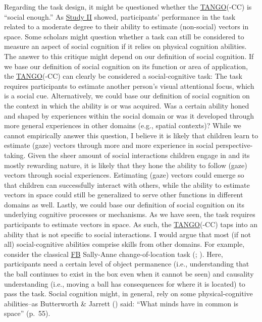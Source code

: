 \documentclass[
]{scrbook}
\begin{document}
Regarding the task design, it might be questioned whether the \hyperref[acronyms_TANGO]{TANGO}(-CC) is ``social enough.'' As \hyperref[studyII]{Study II} showed, participants' performance in the task related to a moderate degree to their ability to estimate (non-social) vectors in space. Some scholars might question whether a task can still be considered to measure an aspect of social cognition if it relies on physical cognition abilities.
The answer to this critique might depend on our definition of social cognition. If we base our definition of social cognition on its function or area of application, the \hyperref[acronyms_TANGO]{TANGO}(-CC) can clearly be considered a social-cognitive task: The task requires participants to estimate another person's visual attentional focus, which is a social cue.
Alternatively, we could base our definition of social cognition on the context in which the ability is or was acquired. Was a certain ability honed and shaped by experiences within the social domain or was it developed through more general experiences in other domains (e.g., spatial contexts)? While we cannot empirically answer this question, I believe it is likely that children learn to estimate (gaze) vectors through more and more experience in social perspective-taking. Given the sheer amount of social interactions children engage in and its mostly rewarding nature, it is likely that they hone the ability to follow (gaze) vectors through social experiences.
Estimating (gaze) vectors could emerge so that children can successfully interact with others, while the ability to estimate vectors in space could still be generalized to serve other functions in different domains as well.
Lastly, we could base our definition of social cognition on its underlying cognitive processes or mechanisms. As we have seen, the task requires participants to estimate vectors in space. As such, the \hyperref[acronyms_TANGO]{TANGO}(-CC) taps into an ability that is not specific to social interactions. I would argue that most (if not all) social-cognitive abilities comprise skills from other domains. For example, consider the classical \hyperref[acronyms_FB]{FB} Sally-Anne change-of-location task (; ). Here, participants need a certain level of object permanence (i.e., understanding that the ball continues to exist in the box even when it cannot be seen) and causality understanding (i.e., moving a ball has consequences for where it is located) to pass the task. Social cognition might, in general, rely on some physical-cognitive abilities\thinspace --\thinspace as Butterworth \& Jarrett () said: ``What minds have in common is space'' (p.~55).
\end{document}
